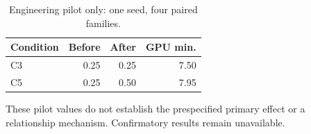 \begin{table}[ht]
\centering
\caption{Engineering pilot only: one seed, four paired families.}
\begin{tabular}{lrrr}\toprule
Condition & Before & After & GPU min.\\\midrule
C3 & 0.25 & 0.25 & 7.50\\
C5 & 0.25 & 0.50 & 7.95\\
\bottomrule\end{tabular}\end{table}
These pilot values do not establish the prespecified primary effect or a relationship mechanism. Confirmatory results remain unavailable.
